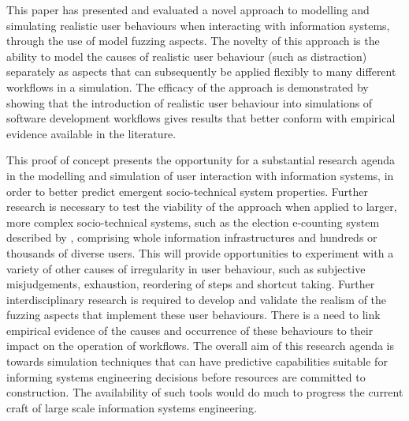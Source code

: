 \documentclass{llncs}
\begin{document}
This paper has presented and evaluated a novel approach to modelling and simulating realistic user behaviours when
interacting with information systems, through the use of model fuzzing aspects.  The novelty of this approach is the
ability to model the causes of realistic user behaviour (such as distraction) separately as aspects that can
subsequently be applied flexibly to many different workflows in a simulation. The efficacy of the approach is
demonstrated by showing that the introduction of realistic user behaviour into simulations of software development
workflows gives results that better conform with empirical evidence available in the literature.

This proof of concept presents the opportunity for a substantial research agenda in the modelling and simulation of user
interaction with information systems, in order to better predict emergent socio-technical system properties. Further
research is necessary to test the viability of the approach when applied to larger, more complex socio-technical
systems, such as the election e-counting system described by \citet{lock07observations}, comprising whole information
infrastructures and hundreds or thousands of diverse users.  This will provide opportunities to experiment with a
variety of other causes of irregularity in user behaviour, such as subjective misjudgements, exhaustion, reordering of
steps and shortcut taking.  Further interdisciplinary research is required to develop and validate the realism of the
fuzzing aspects that implement these user behaviours. There is a need to link empirical evidence of the causes and
occurrence of these behaviours to their impact on the operation of workflows.  The overall aim of this research agenda
is towards simulation techniques that can have predictive capabilities suitable for informing systems engineering
decisions before resources are committed to construction.  The availability of such tools would do much to progress the
current craft of large scale information systems engineering.






\end{document}

